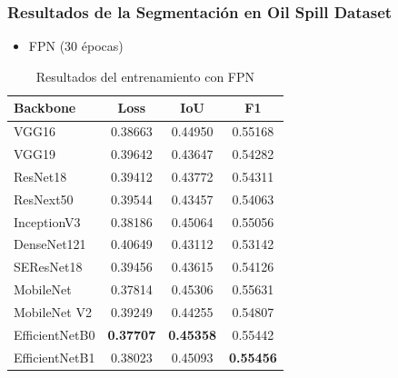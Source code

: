 \begin{frame}
\frametitle{Resultados de la Segmentación en Oil Spill Dataset}

\begin{itemize}
    \item FPN (30 épocas)
\end{itemize}
    
    \begin{table}[]
        \centering
        \small
        \begin{tabular}{l|c|c|c}
            \hline
            Backbone        & Loss    & IoU     & F1 \\
            \hline
            VGG16           & 0.38663 & 0.44950 & 0.55168 \\
            VGG19           & 0.39642 & 0.43647 & 0.54282 \\
            ResNet18        & 0.39412 & 0.43772 & 0.54311 \\
            ResNext50       & 0.39544 & 0.43457 & 0.54063 \\ 
            InceptionV3     & 0.38186 & 0.45064 & 0.55056 \\
            DenseNet121     & 0.40649 & 0.43112 & 0.53142 \\
            SEResNet18      & 0.39456 & 0.43615 & 0.54126 \\
            MobileNet       & 0.37814 & 0.45306 & 0.55631 \\ 
            MobileNet V2    & 0.39249 & 0.44255 & 0.54807 \\
            EfficientNetB0  & \textbf{0.37707} & \textbf{0.45358} & 0.55442 \\
            EfficientNetB1  & 0.38023 & 0.45093 & \textbf{0.55456} \\
            \hline
        \end{tabular}
        \caption{Resultados del entrenamiento con FPN}
        \label{tab:my_label}
    \end{table}
\end{frame}

